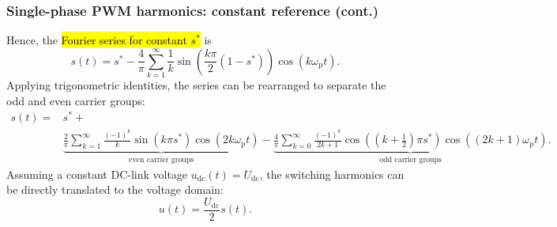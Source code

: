 \begin{frame}
    \frametitle{Single-phase PWM harmonics: constant reference (cont.)}
    Hence, the \hl{Fourier series for constant $s^*$} is
    \begin{equation}
        s(t)=s^* - \frac{4}{\pi}\sum_{k=1}^{\infty}\frac{1}{k}
        \sin\!\left(\frac{k\pi}{2}(1-s^*)\right)
        \cos\!\left(k\omega_\mathrm{p}t\right).
        \label{eq:Fourier_single_phase_PWM_constant_ref}
    \end{equation}
    Applying trigonometric identities, the series can be rearranged to separate the odd and even carrier groups:
    \begin{align*}
        s(t)  = & s^*+                                                                                                                                            \\
                & \underbrace{\frac{2}{\pi}\sum_{k=1}^{\infty}\frac{(-1)^k}{k}\sin(k\pi s^*)\cos\!\left(2k\omega_\mathrm{p}t\right)}_{\text{even carrier groups}}
        -\underbrace{\frac{4}{\pi}\sum_{k=0}^{\infty}\frac{(-1)^k}{2k+1}
             \cos\!\left((k+\tfrac{1}{2})\pi s^*\right)
             \cos\!\left((2k+1)\omega_\mathrm{p}t\right)}_{\text{odd carrier groups}}.
    \end{align*}
    Assuming a constant DC-link voltage $u_\mathrm{dc}(t)=U_\mathrm{dc}$, the switching harmonics can be directly translated to the voltage domain:
    \begin{equation}
        u(t)=\frac{U_\mathrm{dc}}{2}s(t).
    \end{equation}
\end{frame}

